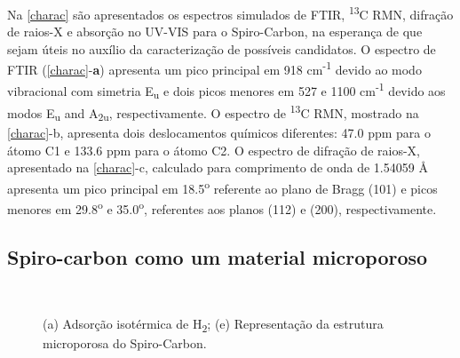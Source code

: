 	Na \autoref{charac} são apresentados os espectros simulados de FTIR, \textsuperscript{13}C RMN, difração de raios-X e absorção no UV-VIS para o Spiro-Carbon, na esperança de que sejam úteis no auxílio da caracterização de possíveis candidatos. O espectro de FTIR (\autoref{charac}-\textbf{a}) apresenta um pico principal em 918 cm\textsuperscript{-1} devido ao modo vibracional com simetria E\textsubscript{u} e dois picos menores em 527 e 1100 cm\textsuperscript{-1} devido aos modos  E\textsubscript{u} and A\textsubscript{2u}, respectivamente. O espectro de \textsuperscript{13}C RMN, mostrado na \autoref{charac}-b, apresenta dois deslocamentos químicos diferentes: 47.0 ppm para o átomo C1 e 133.6 ppm para o átomo C2. O espectro de difração de raios-X, apresentado na \autoref{charac}-c, calculado para comprimento de onda de 1.54059 \AA{} apresenta um pico principal em 18.5\textsuperscript{o} referente ao plano de Bragg (101) e picos menores em 29.8\textsuperscript{o} e 35.0\textsuperscript{o}, referentes aos planos (112) e (200), respectivamente.
	
	\subsection{Spiro-carbon como um material microporoso}
	
	\begin{figure}[ht]
		\centering
		\\
		\caption{(a) Adsorção isotérmica de H\textsubscript{2}; (e) Representação da estrutura microporosa do Spiro-Carbon.}
		\label{charac_poros}
	\end{figure}

